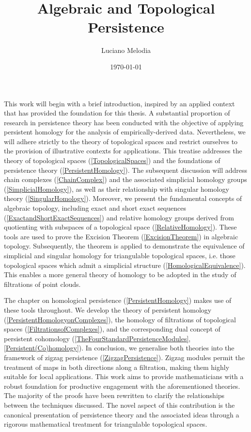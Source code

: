 \documentclass[b5paper, 11pt, twoside]{report}
\title{Algebraic and Topological Persistence}
\author{Luciano Melodia}
\date{\today}
\begin{document}


This work will begin with a brief introduction, inspired by an applied context that has provided the foundation for this thesis.  A substantial proportion of research in persistence theory has been conducted with the objective of applying persistent homology for the analysis of empirically-derived data. Nevertheless, we will adhere strictly to the theory of topological spaces and restrict ourselves to the provision of illustrative contexts for applications. This treatise addresses the theory of topological spaces (\ref{TopologicalSpaces}) and the foundations of persistence theory (\ref{PersistentHomology}). The subsequent discussion will address chain complexes (\ref{ChainComplex}) and the associated simplicial homology groups (\ref{SimplicialHomology}), as well as their relationship with singular homology theory (\ref{SingularHomology}). Moreover, we present the fundamental concepts of algebraic topology, including exact and short exact sequences (\ref{ExactandShortExactSequences}) and relative homology groups derived from quotienting with subspaces of a topological space (\ref{RelativeHomology}). These tools are used to prove the Excision Theorem (\ref{ExcisionTheorem}) in algebraic topology. Subsequently, the theorem is applied to demonstrate the equivalence of simplicial and singular homology for triangulable topological spaces, i.e. those topological spaces which admit a simplicial structure (\ref{HomologicalEquivalence}). This enables a more general theory of homology to be adopted in the study of filtrations of point clouds.

The chapter on homological persistence (\ref{PersistentHomology}) makes use of these tools throughout. We develop the theory of persistent homology (\ref{PersistentHomologyonComplexes}), the homology of filtrations of topological spaces (\ref{FiltrationsofComplexes}), and the corresponding dual concept of persistent cohomology (\ref{TheFourStandardPersistenceModules}, \ref{Persistent(Co)homology}). In conclusion, we generalise both theories into the framework of zigzag persistence (\ref{ZigzagPersistence}). Zigzag modules permit the treatment of maps in both directions along a filtration, making them highly suitable for local applications. This work aims to provide mathematicians with a robust foundation for productive engagement with the aforementioned theories. The majority of the proofs have been rewritten to clarify the relationships between the techniques discussed. The novel aspect of this contribution is the canonical presentation of persistence theory and the associated ideas through a rigorous mathematical treatment for triangulable topological spaces.
\end{document}
